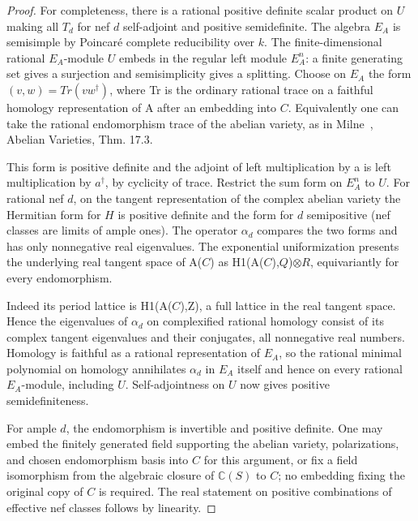 \documentclass[11pt]{article}
\begin{document}
\begin{proof}
For completeness, there is a rational positive definite scalar product on \(U\) making all \(T_d\) for
nef \(d\) self-adjoint and positive semidefinite. The algebra \(E_A\) is semisimple by Poincaré complete
reducibility over \(k\). The finite-dimensional rational \(E_A\)-module \(U\) embeds in the regular left
module \(E_A^n\): a finite generating set gives a surjection and semisimplicity gives a splitting. Choose
on \(E_A\) the form \((v,w)=Tr(vw^\dagger )\), where Tr is the ordinary rational trace on a faithful
homology representation of A after an embedding into \(C\). Equivalently one can take the rational
endomorphism trace of the abelian variety, as in Milne~\cite{Milne}, Abelian Varieties, Thm. 17.3.

This form is positive definite and the adjoint of left multiplication by a is left multiplication by
\(a^\dagger\), by cyclicity of trace. Restrict the sum form on \(E_A^n\) to \(U\). For rational nef
\(d\), on the tangent representation of the complex abelian variety the Hermitian form for \(H\) is
positive definite and the form for \(d\) semipositive (nef classes are limits of ample ones). The
operator \(\alpha_d\) compares the two forms and has only nonnegative real eigenvalues. The exponential
uniformization presents the underlying real tangent space of A(\(C\)) as
H1(A(\(C\)),\(Q\))\(\otimes R\), equivariantly for every endomorphism.

Indeed its period lattice is H1(A(\(C\)),Z), a full lattice in the real tangent space. Hence the
eigenvalues of \(\alpha_d\) on complexified rational homology consist of its complex tangent eigenvalues
and their conjugates, all nonnegative real numbers. Homology is faithful as a rational representation of
\(E_A\), so the rational minimal polynomial on homology annihilates \(\alpha_d\) in \(E_A\) itself and
hence on every rational \(E_A\)-module, including \(U\). Self-adjointness on \(U\) now gives positive
semidefiniteness.

For ample \(d\), the endomorphism is invertible and positive definite. One may embed the finitely
generated field supporting the abelian variety, polarizations, and chosen endomorphism basis into \(C\)
for this argument, or fix a field isomorphism from the algebraic closure of \(\mathbb C(S)\) to \(C\); no
embedding fixing the original copy of \(C\) is required. The real statement on positive combinations of
effective nef classes follows by linearity.


\end{proof}
\end{document}
